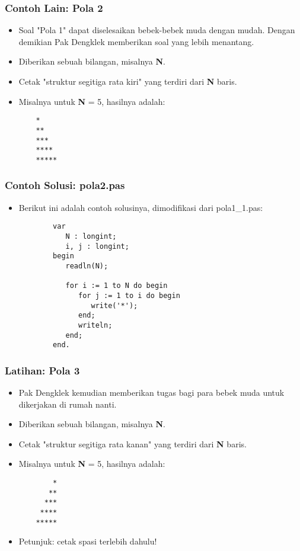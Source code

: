 \documentclass{beamer}
\begin{document}
\begin{frame}[fragile]
\frametitle{Contoh Lain: Pola 2}
\begin{itemize}
	\item Soal "Pola 1" dapat diselesaikan bebek-bebek muda dengan mudah. Dengan demikian Pak Dengklek memberikan soal yang lebih menantang.
	\item Diberikan sebuah bilangan, misalnya \textbf{N}.
	\item Cetak "struktur segitiga rata kiri" yang terdiri dari \textbf{N} baris.
	\item Misalnya untuk \textbf{N} = 5, hasilnya adalah:
	\begin{lstlisting}
	*
	**
	***
	****
	*****
	\end{lstlisting} 
\end{itemize}
\end{frame}

\begin{frame}[fragile]
\frametitle{Contoh Solusi: pola2.pas}
\begin{itemize}
	\item Berikut ini adalah contoh solusinya, dimodifikasi dari pola1\_1.pas:
	\begin{lstlisting}
		var
		   N : longint;
		   i, j : longint;
		begin
		   readln(N);
		
		   for i := 1 to N do begin
		      for j := 1 to i do begin
		         write('*');
		      end;
		      writeln;
		   end;
		end.
	\end{lstlisting}
\end{itemize}
\end{frame}

\begin{frame}[fragile]
\frametitle{Latihan: Pola 3}
\begin{itemize}
	\item Pak Dengklek kemudian memberikan tugas bagi para bebek muda untuk dikerjakan di rumah nanti.
	\item Diberikan sebuah bilangan, misalnya \textbf{N}.
	\item Cetak "struktur segitiga rata kanan" yang terdiri dari \textbf{N} baris.
	\item Misalnya untuk \textbf{N} = 5, hasilnya adalah:
	\begin{lstlisting}
	    *
	   **
	  ***
	 ****
	*****
	\end{lstlisting} 
	\item Petunjuk: cetak spasi terlebih dahulu!
\end{itemize}
\end{frame}
\end{document}
